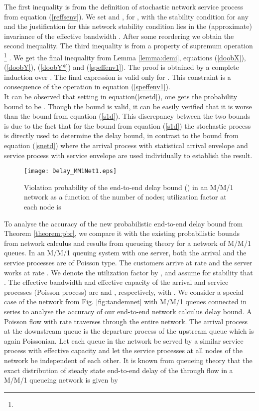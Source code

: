 \documentclass[letterpaper]{IEEEtran}
\begin{document}
\normalsize
The first inequality is from the definition of stochastic network service process from equation (\ref{reffsenv}). We set  and , for , with the stability condition  for any  and the justification for this network stability condition lies in the (approximate) invariance of the effective bandwidth  \cite{spects:2008}. After some reordering we obtain the second inequality. The third inequality is from a property of supremum operation \footnote{    } \cite{yuming:2006}. We get the final inequality from Lemma \ref{lemma:demi}, equations (\ref{doobX}), (\ref{doobY}), (\ref{doobY*}) and (\ref{speffenv1}). The proof is obtained by a complete induction over . The final expression is valid only for . This constraint is a consequence of the  operation in equation (\ref{speffenv1}).\\
It can be observed that setting  in equation(\ref{snetd}), one gets the probability bound to be . Though the bound is valid, it can be easily verified that it is worse than the bound  from equation (\ref{s1d}). This discrepancy between the two bounds is due to the fact that for the bound from equation (\ref{s1d}) the stochastic process  is directly used to determine the delay bound, in contrast to the bound from equation (\ref{snetd}) where the arrival process with statistical arrival envelope and service process with service envelope are used individually to establish the result. 
\begin{figure}
\centering
\texttt{[image: Delay\_MM1Net1.eps]}
\caption{Violation probability of the end-to-end delay bound () in an M/M/1 network as a function of the number of
nodes; utilization factor at each node is }
\label{fig:demiDelay} \vspace{-5 mm}
\end{figure}

To analyse the accuracy of the new probabilistic end-to-end delay bound from Theorem \ref{theorem:pbr}, we compare it with the existing probabilistic bounds from network calculus and results from queueing theory for a network of M/M/1 queues. In an M/M/1 queuing system with one server, both the arrival and the service processes are of Poisson type. The customers arrive at rate  and the server works at rate . We denote the utilization factor by , and assume for stability that . The effective bandwidth and effective capacity of the arrival and service processes (Poisson process) are  and , respectively, with . We consider a special case of the network from Fig. \ref{fig:tandemnet} with  M/M/1 queues connected in series to analyse the accuracy of our end-to-end network calculus delay bound. A Poisson flow with rate  traverses through the entire network. The arrival process at the downstream queue is the departure process of the upstream queue which is again Poissonian. Let each queue in the network be served by a similar service process  with effective capacity  and let the service processes at all nodes of the network be independent of each other. It is known from queueing theory that the exact distribution of steady state end-to-end delay of the through flow  in a M/M/1 queueing network is given by 
\small
\end{document}
